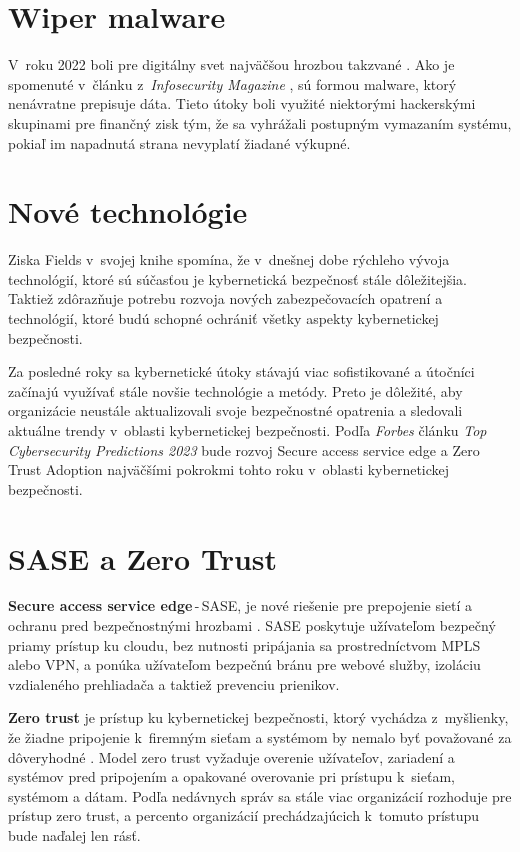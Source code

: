 \documentclass[a4paper, 11pt]{article}
\begin{document}
\section{Wiper malware}
V~roku 2022 boli pre digitálny svet najväčšou hrozbou takzvané 
. Ako je spomenuté v~článku z~{\it Infosecurity Magazine} \cite{poireault-infosecmagazine-q1-2023},  
sú formou malware, ktorý nenávratne prepisuje dáta. Tieto útoky 
boli využité niektorými hackerskými skupinami pre finančný zisk 
tým, že sa vyhrážali postupným vymazaním systému, pokiaľ im 
napadnutá strana nevyplatí žiadané výkupné.

\section{Nové technológie}
Ziska Fields v~svojej knihe \cite{fields2018handbook} spomína, že v~dnešnej dobe rýchleho vývoja technológií, ktoré sú súčasťou  je kybernetická bezpečnosť stále dôležitejšia. Taktiež zdôrazňuje potrebu rozvoja nových zabezpečovacích opatrení a technológií, ktoré budú schopné ochrániť všetky aspekty kybernetickej bezpečnosti.

Za posledné roky sa kybernetické útoky stávajú viac sofistikované a útočníci začínajú využívať stále novšie technológie a metódy. Preto je dôležité, aby organizácie neustále aktualizovali svoje bezpečnostné opatrenia a sledovali aktuálne trendy v~oblasti kybernetickej bezpečnosti. Podľa {\it Forbes} článku {\it Top Cybersecurity Predictions 2023} \cite{sayegh2022top} bude rozvoj Secure access service edge a Zero Trust Adoption najväčšími pokrokmi tohto roku v~oblasti kybernetickej bezpečnosti.

\section{SASE a Zero Trust}
\textbf{Secure access service edge}\,-\,SASE, je nové riešenie pre prepojenie sietí a ochranu pred bezpečnostnými hrozbami \cite{chen2023overview}. SASE poskytuje užívateľom bezpečný priamy prístup ku cloudu, bez nutnosti pripájania sa prostredníctvom MPLS alebo VPN, a ponúka užívateľom bezpečnú bránu pre webové služby, izoláciu vzdialeného prehliadača a taktiež prevenciu prienikov.

\textbf{Zero trust} je prístup ku kybernetickej bezpečnosti, ktorý vychádza z~myšlienky, že žiadne pripojenie k~firemným sieťam a systémom by nemalo byť považované za dôveryhodné \cite{pratt2022history}. Model zero trust vyžaduje overenie užívateľov, zariadení a systémov pred pripojením a opakované overovanie pri prístupu k~sieťam, systémom a dátam. Podľa nedávnych správ sa stále viac organizácií rozhoduje pre prístup zero trust, a percento organizácií prechádzajúcich k~tomuto prístupu bude naďalej len rásť. 
\end{document}
